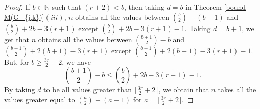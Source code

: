 \documentclass[preprint,sort&compress,12pt]{elsarticle}
\numberwithin{equation}{section}
\theoremstyle{definition}
\newcommand{\Z}{\mathbb{Z}}
\newcommand{\sabnam}[1]{{\color{red} #1}}
\begin{document}
\begin{proof}
If $b \in \mathbb N$ such that $(r+2) < b$, then taking $d=b$ in Theorem \ref{bound M(G_{j,k})}$(iii)$, $n$ obtains all the values between
 $\binom{b}{2}-(b-1)$ and $ \binom{b}{2}+2b-3(r+1)$ except $\binom{b}{2}+2b-3(r+1)-1$.
 Taking $d=b+1$, we get that $n$ obtains all the values between $\binom{b+1}{2}-b 
 $ and $\binom{b+1}{2}+2(b+1)-3(r+1)$   except $\binom{b+1}{2}+2(b+1)-3(r+1)-1$.
  But, for $b \ge \frac{3r}{2}+2$, we have 
    $$\binom{b+1}{2}-b \le \binom{b}{2}+2b-3(r+1)-1.$$
    By taking $d$ to be all values greater than $\lceil\frac{3r}{2}+2\rceil$, we obtain that 
    $n$ takes all the values greater equal to $\binom{a}{2}-(a-1)$ for $a=\lceil\frac{3r}{2}+2\rceil$.
\end{proof}

\end{document}
